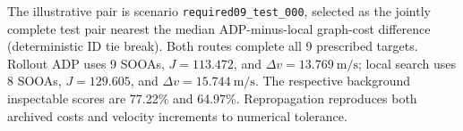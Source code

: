 The illustrative pair is scenario \texttt{required09\_test\_000}, selected as the jointly complete test pair nearest the median ADP-minus-local graph-cost difference (deterministic ID tie break). Both routes complete all 9 prescribed targets. Rollout ADP uses 9 SOOAs, $J=113.472$, and $\Delta v=13.769~\mathrm{m/s}$; local search uses 8 SOOAs, $J=129.605$, and $\Delta v=15.744~\mathrm{m/s}$. The respective background inspectable scores are 77.22\% and 64.97\%. Repropagation reproduces both archived costs and velocity increments to numerical tolerance.
